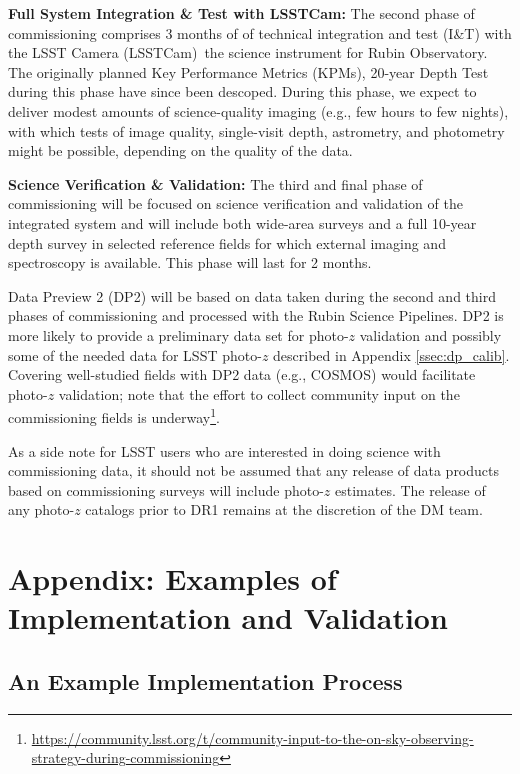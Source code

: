 \documentclass[DM,lsstdraft,toc]{lsstdoc}
\begin{document}
{\bf Full System Integration \& Test with LSSTCam:}
The second phase of commissioning comprises 3 months of of technical integration and test (I\&T) with  the LSST Camera (LSSTCam) \textemdash \,the science instrument for Rubin Observatory. 
The originally planned Key Performance Metrics (KPMs), 20-year Depth Test during this phase have since been descoped. 
During this phase, we expect to deliver modest amounts of science-quality imaging (e.g., few hours to few nights), with which tests of image quality, single-visit depth, astrometry, and photometry might be possible, depending on the quality of the data. 

{\bf Science Verification \& Validation:}
The third and final phase of commissioning will be focused on science verification and validation of the integrated system and will include both wide-area surveys and a full 10-year depth survey in selected reference fields for which external imaging and spectroscopy is available. 
This phase will last for 2 months. 

Data Preview 2 (DP2) will be based on data taken during the second and third phases of commissioning and processed with the Rubin Science Pipelines. 
DP2 is more likely to provide a preliminary data set for photo-$z$ validation and possibly some of the needed 
 data for LSST photo-$z$ described in Appendix \ref{ssec:dp_calib}. 
Covering well-studied fields with DP2 data (e.g., COSMOS) would facilitate photo-$z$ validation; note that the effort to collect community input on the commissioning fields is underway\footnote{\url{https://community.lsst.org/t/community-input-to-the-on-sky-observing-strategy-during-commissioning}}.

As a side note for LSST users who are interested in doing science with commissioning data, it should not be assumed that any release of data products based on commissioning surveys will include photo-$z$ estimates.
The release of any photo-$z$ catalogs prior to DR1 remains at the discretion of the DM team.



\clearpage
\appendix 

\section{Appendix: Examples of Implementation and Validation}\label{sec:imp}

\subsection{An Example Implementation Process}\label{ssec:imp_imp}
\end{document}
